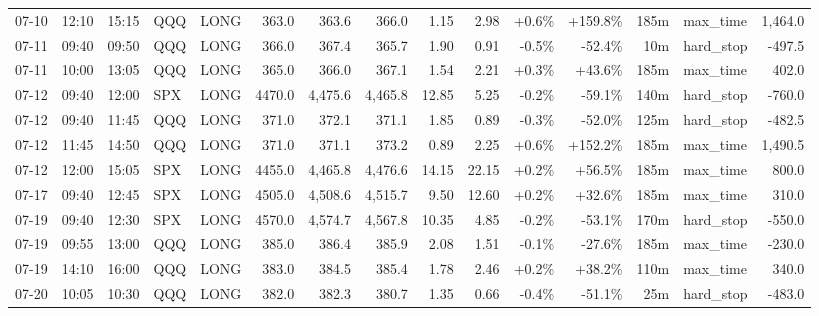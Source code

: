 \documentclass[11pt,a4paper,twoside]{article}
\begin{document}
\begin{landscape}
\begin{center}
\begin{longtable}{>{\color{txtmain}}l l l l l r r r r r r r r >{\color{txtmain}}l r}
07-10 & 12:10 & 15:15 & QQQ & LONG & 363.0 & 363.6 & 366.0 & 1.15 & 2.98 & \textcolor{wingreen}{+0.6\%} & \textcolor{wingreen}{+159.8\%} & 185m & max\_time & \textcolor{wingreen}{1,464.0} \\
07-11 & 09:40 & 09:50 & QQQ & LONG & 366.0 & 367.4 & 365.7 & 1.90 & 0.91 & \textcolor{lossred}{-0.5\%} & \textcolor{lossred}{-52.4\%} & 10m & hard\_stop & \textcolor{lossred}{-497.5} \\
07-11 & 10:00 & 13:05 & QQQ & LONG & 365.0 & 366.0 & 367.1 & 1.54 & 2.21 & \textcolor{wingreen}{+0.3\%} & \textcolor{wingreen}{+43.6\%} & 185m & max\_time & \textcolor{wingreen}{402.0} \\
07-12 & 09:40 & 12:00 & SPX & LONG & 4470.0 & 4,475.6 & 4,465.8 & 12.85 & 5.25 & \textcolor{lossred}{-0.2\%} & \textcolor{lossred}{-59.1\%} & 140m & hard\_stop & \textcolor{lossred}{-760.0} \\
07-12 & 09:40 & 11:45 & QQQ & LONG & 371.0 & 372.1 & 371.1 & 1.85 & 0.89 & \textcolor{lossred}{-0.3\%} & \textcolor{lossred}{-52.0\%} & 125m & hard\_stop & \textcolor{lossred}{-482.5} \\
07-12 & 11:45 & 14:50 & QQQ & LONG & 371.0 & 371.1 & 373.2 & 0.89 & 2.25 & \textcolor{wingreen}{+0.6\%} & \textcolor{wingreen}{+152.2\%} & 185m & max\_time & \textcolor{wingreen}{1,490.5} \\
07-12 & 12:00 & 15:05 & SPX & LONG & 4455.0 & 4,465.8 & 4,476.6 & 14.15 & 22.15 & \textcolor{wingreen}{+0.2\%} & \textcolor{wingreen}{+56.5\%} & 185m & max\_time & \textcolor{wingreen}{800.0} \\
07-17 & 09:40 & 12:45 & SPX & LONG & 4505.0 & 4,508.6 & 4,515.7 & 9.50 & 12.60 & \textcolor{wingreen}{+0.2\%} & \textcolor{wingreen}{+32.6\%} & 185m & max\_time & \textcolor{wingreen}{310.0} \\
07-19 & 09:40 & 12:30 & SPX & LONG & 4570.0 & 4,574.7 & 4,567.8 & 10.35 & 4.85 & \textcolor{lossred}{-0.2\%} & \textcolor{lossred}{-53.1\%} & 170m & hard\_stop & \textcolor{lossred}{-550.0} \\
07-19 & 09:55 & 13:00 & QQQ & LONG & 385.0 & 386.4 & 385.9 & 2.08 & 1.51 & \textcolor{lossred}{-0.1\%} & \textcolor{lossred}{-27.6\%} & 185m & max\_time & \textcolor{lossred}{-230.0} \\
07-19 & 14:10 & 16:00 & QQQ & LONG & 383.0 & 384.5 & 385.4 & 1.78 & 2.46 & \textcolor{wingreen}{+0.2\%} & \textcolor{wingreen}{+38.2\%} & 110m & max\_time & \textcolor{wingreen}{340.0} \\
07-20 & 10:05 & 10:30 & QQQ & LONG & 382.0 & 382.3 & 380.7 & 1.35 & 0.66 & \textcolor{lossred}{-0.4\%} & \textcolor{lossred}{-51.1\%} & 25m & hard\_stop & \textcolor{lossred}{-483.0} \\

\end{longtable}
\end{center}
\end{landscape}
\end{document}
